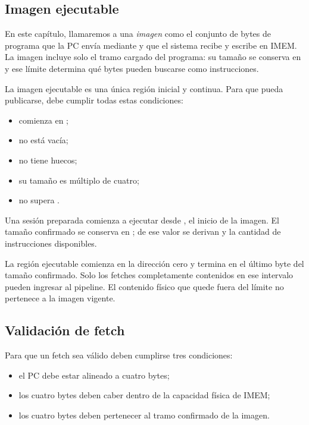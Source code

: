 \subsection{Imagen ejecutable}

En este capítulo, llamaremos a una \emph{imagen} como el conjunto de bytes de programa que la
PC envía mediante  y que el sistema recibe y escribe en IMEM. La imagen incluye solo el tramo cargado del programa:
su tamaño se conserva en  y ese límite determina
qué bytes pueden buscarse como instrucciones.

La imagen ejecutable es una única región inicial y continua. Para que pueda
publicarse, debe cumplir todas estas condiciones:

\begin{itemize}
  \item comienza en ;
  \item no está vacía;
  \item no tiene huecos;
  \item su tamaño es múltiplo de cuatro;
  \item no supera .
\end{itemize}

Una sesión preparada comienza a ejecutar desde , el inicio de la
imagen. El tamaño confirmado se conserva en ; de
ese valor se derivan  y la cantidad de instrucciones
disponibles.

La región ejecutable comienza en la dirección cero y termina en el último byte
del tamaño confirmado. Solo los fetches completamente contenidos en ese
intervalo pueden ingresar al pipeline. El contenido físico que quede fuera del
límite no pertenece a la imagen vigente.

\subsection{Validación de fetch}

Para que un fetch sea válido deben cumplirse tres condiciones:

\begin{itemize}
  \item el PC debe estar alineado a cuatro bytes;
  \item los cuatro bytes deben caber dentro de la capacidad física de IMEM;
  \item los cuatro bytes deben pertenecer al tramo confirmado de la imagen.
\end{itemize}

